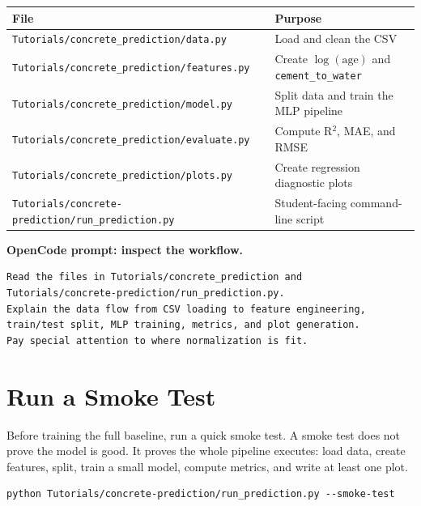 \documentclass[11pt]{article}
\begin{document}
\begin{center}
\begin{tabular}{l l}
\toprule
\textbf{File} & \textbf{Purpose} \\
\midrule
\texttt{Tutorials/concrete\_prediction/data.py} & Load and clean the CSV \\
\texttt{Tutorials/concrete\_prediction/features.py} & Create $\log(\text{age})$ and \texttt{cement\_to\_water} \\
\texttt{Tutorials/concrete\_prediction/model.py} & Split data and train the MLP pipeline \\
\texttt{Tutorials/concrete\_prediction/evaluate.py} & Compute R$^2$, MAE, and RMSE \\
\texttt{Tutorials/concrete\_prediction/plots.py} & Create regression diagnostic plots \\
\texttt{Tutorials/concrete-prediction/run\_prediction.py} & Student-facing command-line script \\
\bottomrule
\end{tabular}
\end{center}

\begin{ex-box}
\textbf{OpenCode prompt: inspect the workflow.}
\begin{lstlisting}[style=term]
Read the files in Tutorials/concrete_prediction and Tutorials/concrete-prediction/run_prediction.py.
Explain the data flow from CSV loading to feature engineering, train/test split, MLP training, metrics, and plot generation.
Pay special attention to where normalization is fit.
\end{lstlisting}
\end{ex-box}

\section{Run a Smoke Test}
\label{sec:smoke-test}

Before training the full baseline, run a quick smoke test.  A smoke test does not prove the model is good.  It proves the whole pipeline executes: load data, create features, split, train a small model, compute metrics, and write at least one plot.

\begin{lstlisting}[style=term]
python Tutorials/concrete-prediction/run_prediction.py --smoke-test
\end{lstlisting}
\end{document}
